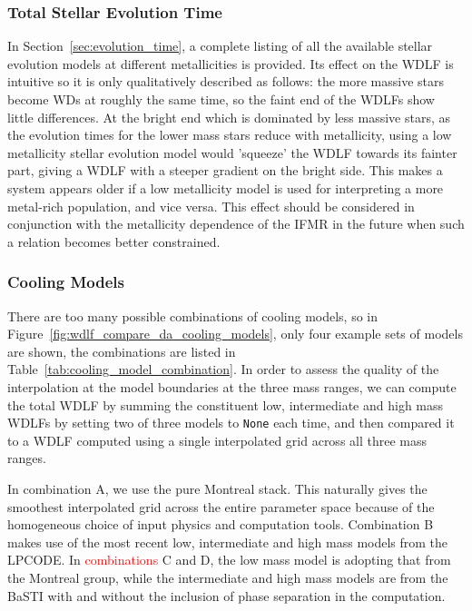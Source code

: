 \documentclass[fleqn,usenatbib]{rasti}
\begin{document}
\subsubsection{Total Stellar Evolution Time}
In Section~\ref{sec:evolution_time}, a complete listing of all the available
stellar evolution models at different metallicities is provided. Its effect on
the WDLF is intuitive so it is only qualitatively described as follows: the more
massive stars become WDs at roughly the same time, so the faint end of the
WDLFs show little differences. At the bright end which is dominated by less
massive stars, as the evolution times for the lower mass stars reduce with
metallicity, using a low metallicity stellar evolution model would 'squeeze'
the WDLF towards its fainter part, giving a WDLF with a steeper gradient on
the bright side. This makes a system appears older if a low metallicity
model is used for interpreting a more metal-rich population, and vice versa.
This effect should be considered in conjunction with the metallicity
dependence of the IFMR in the future when such a relation becomes better
constrained.

\subsubsection{Cooling Models}
There are too many possible combinations of cooling models, so in
Figure~\ref{fig:wdlf_compare_da_cooling_models}, only four example
sets of models are shown, the combinations are listed in
Table~\ref{tab:cooling_model_combination}. In order to assess the quality of
the interpolation at the model boundaries at the three mass ranges, we can
compute the total WDLF by summing the constituent low, intermediate and high
mass WDLFs by setting two of three models to \texttt{None} each time, and then
compared it to a WDLF computed using a single interpolated grid across
all three mass ranges.

In combination A, we use the pure Montreal stack. This naturally gives the
smoothest interpolated grid across the entire parameter space because of the
homogeneous choice of input physics and computation tools. Combination B makes
use of the most recent low, intermediate and high mass models from the LPCODE.
In \textcolor{red}{combinations} C and D, the low mass model is adopting that from the Montreal
group, while the intermediate and high mass models are from the BaSTI with and
without the inclusion of phase separation in the computation.
\end{document}
